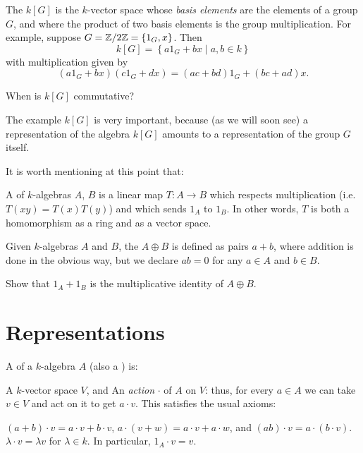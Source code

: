 \begin{example}
	The  $k[G]$ is the $k$-vector space
	whose \emph{basis elements} are the elements of a group $G$,
	and where the product of two basis elements is the group multiplication.
	For example, suppose $G = \mathbb Z/2\mathbb Z = \{1_G, x\}$.
	Then
	\[ k[G] = \left\{ a1_G + bx \mid a,b \in k \right\} \]
	with multiplication given by
	\[ (a1_G + bx)(c1_G+dx) = (ac+bd)1_G + (bc+ad)x. \]
\end{example}
\begin{ques}
	When is $k[G]$ commutative?
\end{ques}
The example $k[G]$ is very important,
because (as we will soon see) a representation of the algebra $k[G]$
amounts to a representation of the group $G$ itself.

It is worth mentioning at this point that:
\begin{definition}
	A  of $k$-algebras $A$, $B$ is a
	linear map $T : A \to B$ which respects multiplication
	(i.e.\ $T(xy) = T(x)T(y)$) and which sends $1_A$ to $1_B$.
	In other words, $T$ is both a homomorphism as a ring and as a vector space.
\end{definition}
\begin{definition}
	Given $k$-algebras $A$ and $B$, the  $A \oplus B$
	is defined as pairs $a + b$, where addition is done in the obvious way,
	but we declare $ab = 0$ for any $a \in A$ and $b \in B$.
\end{definition}
\begin{ques}
	Show that $1_A + 1_B$ is the multiplicative identity of $A \oplus B$.
\end{ques}

\section{Representations}

\begin{definition}
	A  of a $k$-algebra $A$
	(also a ) is:
	\begin{enumerate}[(i)]
		\ii A $k$-vector space $V$, and
		\ii An \emph{action} $\cdot$ of $A$ on $V$: thus, for every $a \in A$
		we can take $v \in V$ and act on it to get $a \cdot v$.
		This satisfies the usual axioms:
		\begin{itemize}
			\ii $(a+b) \cdot v = a \cdot v + b \cdot v$,
			$a \cdot (v+w) = a \cdot v + a \cdot w$,
			and $(ab) \cdot v = a \cdot (b \cdot v)$.
			\ii $\lambda \cdot v = \lambda v$ for $\lambda \in k$.
			In particular, $1_A \cdot v = v$.
		\end{itemize}
	\end{enumerate}
\end{definition}


